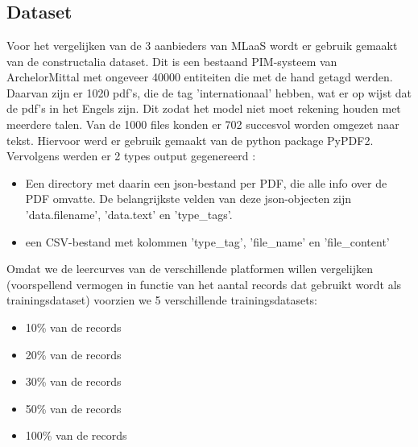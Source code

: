 
\chapter{}%
\label{ch:methodologie}


\section{Dataset}
Voor het vergelijken van de 3 aanbieders van MLaaS wordt er gebruik gemaakt van de constructalia dataset. Dit is een bestaand PIM-systeem van ArchelorMittal met ongeveer 40000 entiteiten die met de hand getagd werden. Daarvan zijn er 1020 pdf's, die de tag 'internationaal' hebben, wat er op wijst dat de pdf's in het Engels zijn. Dit zodat het model niet moet rekening houden met meerdere talen. Van de 1000 files konden er 702 succesvol worden omgezet naar tekst. Hiervoor werd er gebruik gemaakt van de python package PyPDF2. Vervolgens werden er 2 types output gegenereerd :
\begin{itemize}
    \item Een directory met daarin een json-bestand per PDF, die alle info over de PDF omvatte. De belangrijkste velden van deze json-objecten zijn 'data.filename', 'data.text' en 'type\_tags'.
    \item een CSV-bestand met kolommen 'type\_tag', 'file\_name' en 'file\_content' 
\end{itemize}

Omdat we de leercurves van de verschillende platformen willen vergelijken (voorspellend vermogen in functie van het aantal records dat gebruikt wordt als trainingsdataset) voorzien we 5 verschillende trainingsdatasets: 
\begin{itemize}
    \item 10\% van de records
    \item 20\% van de records
    \item 30\% van de records
    \item 50\% van de records
    \item 100\% van de records
\end{itemize}


